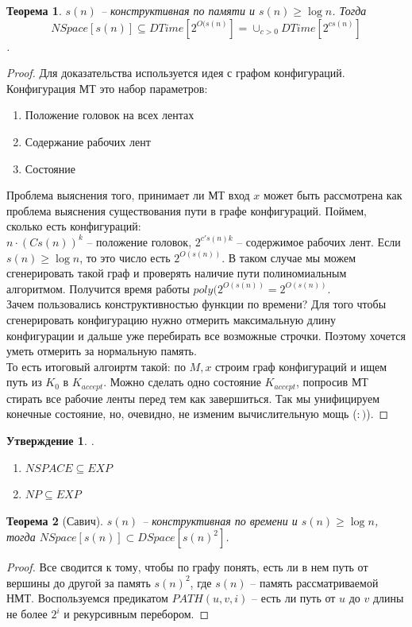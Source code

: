\documentclass[12pt, letterpaper]{article}
\newtheorem{theorem}{Теорема}[section]
\newtheorem{prop}{Утверждение}[section]
\begin{document}
\begin{theorem}
$s(n)$ -- конструктивная по памяти и $s(n) \geq \log n$. Тогда 
$$NSpace[s(n)] \subseteq DTime[2^{O(s(n)}] = \cup_{c>0} DTime[2^{cs(n)}]$$.
\end{theorem}
\begin{proof}
Для доказательства используется идея с графом конфигураций. Конфигурация МТ это набор параметров:
\begin{enumerate}
\item Положение головок на всех лентах
\item Содержание рабочих лент
\item Состояние
\end{enumerate}
Проблема выяснения того, принимает ли МТ вход $x$ может быть рассмотрена как проблема выяснения существования пути в графе конфигураций.  
 Поймем, сколько есть конфигураций:\\
$n \cdot (C s(n))^k$ -- положение головок, $2^{c' s(n) k}$ -- содержимое рабочих лент. Если $s(n) \geq \log n$, то это число есть $2^{O(s(n))}$. В таком случае мы можем сгенерировать такой граф и проверять наличие пути полиномиальным алгоритмом. Получится время работы $poly(2^{O(s(n))} = 2^{O(s(n))}$. \\
Зачем пользовались конструктивностью функции по времени? Для того чтобы сгенерировать конфигурацию нужно отмерить максимальную длину конфигурации и дальше уже перебирать все возможные строчки. Поэтому хочется уметь отмерить за нормальную память. \\
То есть итоговый алгоиртм такой: по $M, x$ строим граф конфигураций и ищем путь из $K_0$ в $K_{accept}$. Можно сделать одно состояние $K_{accept}$, попросив МТ стирать все рабочие ленты перед тем как завершиться. Так мы унифицируем конечные состояние, но, очевидно, не изменим вычислительную мощь ($:)$).
\end{proof}

\begin{prop}.
\begin{enumerate}
\item $NSPACE \subseteq EXP$
\item $NP \subseteq EXP$  
\end{enumerate}
\end{prop}

\begin{theorem}[Савич]
$s(n)$ -- конструктивная по времени и $s(n) \geq \log n$, тогда $NSpace[s(n)] \subset DSpace[s(n)^2]$.
\end{theorem}
\begin{proof}
Все сводится к тому, чтобы по графу понять, есть ли в нем путь от вершины до другой за память $s(n)^2$, где $s(n)$ -- память рассматриваемой НМТ. Воспользуемся предикатом $PATH(u,v,i)$ -- есть ли путь от $u$ до $v$ длины не более $2^{i}$ и рекурсивным перебором. 
\end{proof}
\end{document}
